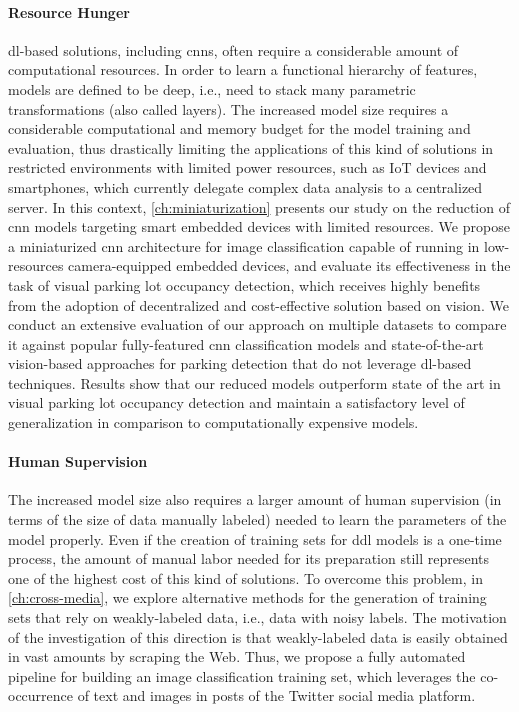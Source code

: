 \paragraph{Resource Hunger}
\Gls{dl}-based solutions, including \glspl{cnn}, often require a considerable amount of computational resources.
In order to learn a functional hierarchy of features, models are defined to be deep, i.e., need to stack many parametric transformations (also called layers).
The increased model size requires a considerable computational and memory budget for the model training and evaluation, thus drastically limiting the applications of this kind of solutions in restricted environments with limited power resources, such as IoT devices and smartphones, which currently delegate complex data analysis to a centralized server.
In this context, \ref{ch:miniaturization} presents our study on the reduction of \gls{cnn} models targeting smart embedded devices with limited resources.
We propose a miniaturized \gls{cnn} architecture for image classification capable of running in low-resources camera-equipped embedded devices, and evaluate its effectiveness in the task of visual parking lot occupancy detection, which receives highly benefits from the adoption of decentralized and cost-effective solution based on vision.
We conduct an extensive evaluation of our approach on multiple datasets to compare it against popular fully-featured \gls{cnn} classification models and state-of-the-art vision-based approaches for parking detection that do not leverage \gls{dl}-based techniques.
Results show that our reduced models outperform state of the art in visual parking lot occupancy detection and maintain a satisfactory level of generalization in comparison to computationally expensive models.

\paragraph{Human Supervision}
The increased model size also requires a larger amount of human supervision (in terms of the size of data manually labeled) needed to learn the parameters of the model properly.
Even if the creation of training sets for d\gls{dl} models is a one-time process, the amount of manual labor needed for its preparation still represents one of the highest cost of this kind of solutions.
To overcome this problem, in \ref{ch:cross-media}, we explore alternative methods for the generation of training sets that rely on weakly-labeled data, i.e., data with noisy labels.
The motivation of the investigation of this direction is that weakly-labeled data is easily obtained in vast amounts by scraping the Web.
Thus, we propose a fully automated pipeline for building an image classification training set, which leverages the co-occurrence of text and images in posts of the Twitter social media platform.

